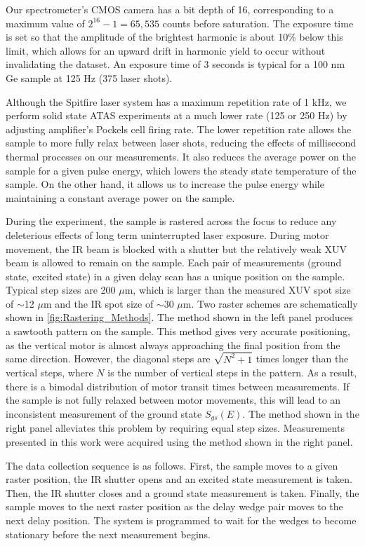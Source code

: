 Our spectrometer's CMOS camera has a bit depth of 16, corresponding to a maximum value of $2^{16}-1 = 65,535$ counts before saturation. The exposure time is set so that the amplitude of the brightest harmonic is about 10\% below this limit, which allows for an upward drift in harmonic yield to occur without invalidating the dataset. An exposure time of 3 seconds is typical for a 100 nm Ge sample at 125 Hz (375 laser shots).

Although the Spitfire laser system has a maximum repetition rate of 1 kHz, we perform solid state ATAS experiments at a much lower rate (125 or 250 Hz) by adjusting amplifier's Pockels cell firing rate. The lower repetition rate allows the sample to more fully relax between laser shots, reducing the effects of millisecond thermal processes on our measurements. It also reduces the average power on the sample for a given pulse energy, which lowers the steady state temperature of the sample. On the other hand, it allows us to increase the pulse energy while maintaining a constant average power on the sample.

During the experiment, the sample is rastered across the focus to reduce any deleterious effects of long term uninterrupted laser exposure. During motor movement, the IR beam is blocked with a shutter but the relatively weak XUV beam is allowed to remain on the sample. Each pair of measurements (ground state, excited state) in a given delay scan has a unique position on the sample. Typical step sizes are 200 $\mu$m, which is larger than the measured XUV spot size of $\sim$12 $\mu$m and the IR spot size of $\sim$30 $\mu$m. Two raster schemes are schematically shown in \cref{fig:Rastering_Methods}. The method shown in the left panel produces a sawtooth pattern on the sample. This method gives very accurate positioning, as the vertical motor is almost always approaching the final position from the same direction. However, the diagonal steps are $\sqrt{N^2+1}$ times longer than the vertical steps, where $N$ is the number of vertical steps in the pattern. As a result, there is a bimodal distribution of motor transit times between measurements. If the sample is not fully relaxed between motor movements, this will lead to an inconsistent measurement of the ground state $S_{gs}(E)$. The method shown in the right panel alleviates this problem by requiring equal step sizes. Measurements presented in this work were acquired using the method shown in the right panel.

The data collection sequence is as follows. First, the sample moves to a given raster position, the IR shutter opens and an excited state measurement is taken. Then, the IR shutter closes and a ground state measurement is taken. Finally, the sample moves to the next raster position as the delay wedge pair moves to the next delay position. The system is programmed to wait for the wedges to become stationary before the next measurement begins.

